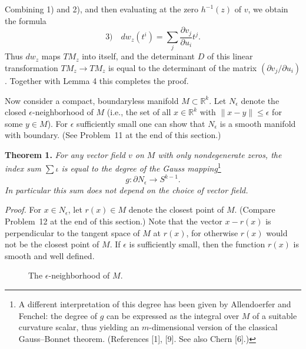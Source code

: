 
Combining 1) and 2), and then evaluating at the zero $h^{-1}(z)$ of $v$, we obtain the formula
\[
\text{3)} \quad dw_z(t^i) = \sum_j \frac{\partial v_j}{\partial u_i} t^j.
\]
Thus $dw_z$ maps $TM_z$ into itself, and the determinant $D$ of this linear transformation $TM_z \to TM_z$ is equal to the determinant of the matrix $(\partial v_j / \partial u_i)$. Together with Lemma 4 this completes the proof.

Now consider a compact, boundaryless manifold $M \subset \mathbb{R}^k$. Let $N_\epsilon$ denote the closed $\epsilon$-neighborhood of $M$ (i.e., the set of all $x \in \mathbb{R}^k$ with $\|x - y\| \leq \epsilon$ for some $y \in M$). For $\epsilon$ sufficiently small one can show that $N_\epsilon$ is a smooth manifold with boundary. (See Problem~11 at the end of this section.)

\noindent\textbf{Theorem 1.} \textit{For any vector field $v$ on $M$ with only nondegenerate zeros, the index sum $\sum \iota$ is equal to the degree of the Gauss mapping}\footnote{A different interpretation of this degree has been given by Allendoerfer and Fenchel: the degree of $g$ can be expressed as the integral over $M$ of a suitable curvature scalar, thus yielding an $m$-dimensional version of the classical Gauss--Bonnet theorem. (References [1], [9]. See also Chern [6].)}
\[
g : \partial N_\epsilon \to S^{k-1}.
\]
\textit{In particular this sum does not depend on the choice of vector field.}

\noindent\textit{Proof.}
For $x \in N_\epsilon$, let $r(x) \in M$ denote the closest point of $M$. (Compare Problem~12 at the end of this section.) Note that the vector $x - r(x)$ is perpendicular to the tangent space of $M$ at $r(x)$, for otherwise $r(x)$ would not be the closest point of $M$. If $\epsilon$ is sufficiently small, then the function $r(x)$ is smooth and well defined.

\begin{figure}[htbp]
\centering
\setcounter{figure}{13}%
\caption{The $\epsilon$-neighborhood of $M$.}\label{fig:milnor-14}
\end{figure}



